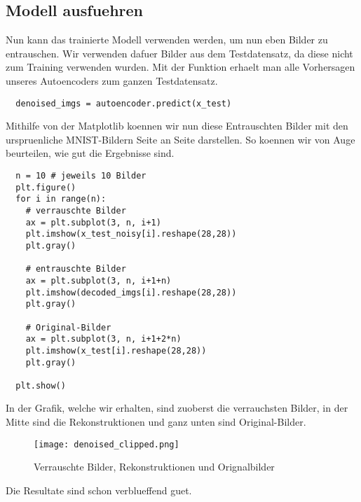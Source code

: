 \subsection{Modell ausfuehren}
Nun kann das trainierte Modell verwenden werden, um nun eben Bilder zu
entrauschen. Wir verwenden dafuer Bilder aus dem Testdatensatz, da diese nicht
zum Training verwenden wurden. Mit der Funktion 
erhaelt man alle Vorhersagen unseres Autoencoders zum ganzen Testdatensatz.
\begin{verbatim}
  denoised_imgs = autoencoder.predict(x_test)
\end{verbatim}
Mithilfe von der Matplotlib koennen wir nun diese Entrauschten Bilder mit den
urspruenliche MNIST-Bildern Seite an Seite darstellen. So koennen wir von Auge
beurteilen, wie gut die Ergebnisse sind.
\begin{verbatim}
  n = 10 # jeweils 10 Bilder
  plt.figure()
  for i in range(n):
    # verrauschte Bilder
    ax = plt.subplot(3, n, i+1)
    plt.imshow(x_test_noisy[i].reshape(28,28))
    plt.gray()

    # entrauschte Bilder
    ax = plt.subplot(3, n, i+1+n)
    plt.imshow(decoded_imgs[i].reshape(28,28))
    plt.gray()

    # Original-Bilder
    ax = plt.subplot(3, n, i+1+2*n)
    plt.imshow(x_test[i].reshape(28,28))
    plt.gray()

  plt.show()
\end{verbatim}
In der Grafik, welche wir erhalten, sind zuoberst die verrauchsten Bilder, in
der Mitte sind die Rekonstruktionen und ganz unten sind Original-Bilder.
\begin{figure}[h!]
  \centering
  \texttt{[image: denoised\_clipped.png]}
  \caption{Verrauschte Bilder, Rekonstruktionen und Orignalbilder}
\end{figure}
Die Resultate sind schon verblueffend guet.

